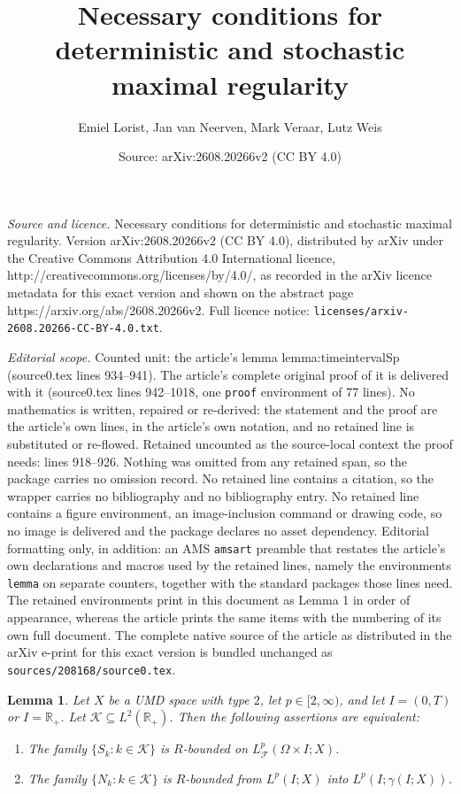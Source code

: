 \documentclass[10pt,a4paper]{amsart}
\title{Necessary conditions for deterministic and stochastic maximal regularity}
\author{Emiel Lorist, Jan van Neerven, Mark Veraar, Lutz Weis}
\date{Source: arXiv:2608.20266v2 (CC BY 4.0)}
\newtheorem{lemma}{Lemma}
\newcommand{\R}{\mathbb R}
\begin{document}
\maketitle

\noindent\emph{Source and licence.} Necessary conditions for deterministic and stochastic maximal regularity. Version arXiv:2608.20266v2 (CC BY 4.0), distributed by arXiv under the Creative Commons Attribution 4.0 International licence, http://creativecommons.org/licenses/by/4.0/, as recorded in the arXiv licence metadata for this exact version and shown on the abstract page https://arxiv.org/abs/2608.20266v2. Full licence notice: \texttt{licenses/arxiv-2608.20266-CC-BY-4.0.txt}.\par\smallskip

\noindent\textit{Editorial scope.} Counted unit: the article's lemma lemma:timeintervalSp (source0.tex lines 934--941). The article's complete original proof of it is delivered with it (source0.tex lines 942--1018, one \texttt{proof} environment of 77 lines). No mathematics is written, repaired or re-derived: the statement and the proof are the article's own lines, in the article's own notation, and no retained line is substituted or re-flowed.  Retained uncounted as the source-local context the proof needs: lines 918--926.  Nothing was omitted from any retained span, so the package carries no omission record.  No retained line contains a citation, so the wrapper carries no bibliography and no bibliography entry.  No retained line contains a figure environment, an image-inclusion command or drawing code, so no image is delivered and the package declares no asset dependency.  Editorial formatting only, in addition: an AMS \texttt{amsart} preamble that restates the article's own declarations and macros used by the retained lines, namely the environments \texttt{lemma} on separate counters, together with the standard packages those lines need.  The retained environments print in this document as Lemma 1 in order of appearance, whereas the article prints the same items with the numbering of its own full document.  The complete native source of the article as distributed in the arXiv e-print for this exact version is bundled unchanged as \texttt{sources/208168/source0.tex}.
\begin{lemma}\label{lem:gammaRbdd}
Let $X$ be a UMD space with type $2$, let
$p\in[2,\infty)$, and let $I=(0,T)$ or $I=\R_+$. Let $\mathcal{K}\subseteq L^2(\R_+)$.
Then the following assertions are equivalent:
\begin{enumerate}[label={\rm(\arabic*)}, leftmargin=*]
\item The family $\{S_k:k\in \mathcal{K}\}$ is $R$-bounded on $L^p_{\mathscr F}(\Omega\times I;X)$.
\item The family $\{N_k:k\in \mathcal{K}\}$ is $R$-bounded from $L^p(I;X)$ into $L^p(I;\gamma(I;X))$.
\end{enumerate}
\end{lemma}
\end{document}
